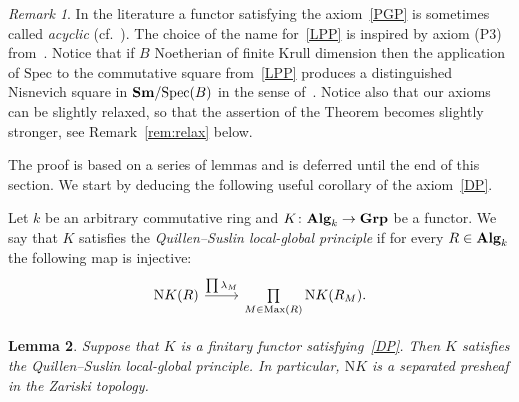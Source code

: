 \documentclass[oneside, 11pt]{amsart}
\numberwithin{equation}{section}
\newtheorem{lemma}{Lemma} \numberwithin{lemma}{section}
\newcommand{\Max}{\mathrm{Max}}
\theoremstyle{definition}
\theoremstyle{definition}
\theoremstyle{remark}
\newtheorem{rem}[lemma]{Remark}
\newcommand{\catname}[1]{{\normalfont\textbf{#1}}} %
\begin{document}
\begin{rem}
 In the literature a functor satisfying the axiom~\ref{PGP} is sometimes called {\it acyclic} (cf.~\cite[Definition~III.4.1.1]{Kbook}).
The choice of the name for~\ref{LPP} is inspired by axiom (P3) from~\cite[Proposition~3.3.4]{AHW18}. Notice that if $B$ Noetherian of finite Krull dimension then the application of $\mathrm{Spec}$ to the commutative square from~\ref{LPP} produces a distinguished Nisnevich square in $\catname{Sm}/\mathrm{Spec}(B)$ in the sense of~\cite[Definition~3.1.3]{MV99}. Notice also that our axioms can be slightly relaxed, so that the assertion of the Theorem becomes slightly stronger, see Remark~\ref{rem:relax} below.
\end{rem}

The proof is based on a series of lemmas and is deferred until the end of this section. We start by deducing the following useful corollary of the axiom~\ref{DP}. 

Let $k$ be an arbitrary commutative ring and $K\colon \catname{Alg}_k \to \catname{Grp}$ be a functor.
We say that $K$ satisfies the {\it Quillen--Suslin local-global principle} if for every $R\in \catname{Alg}_k$ the following map is injective:
\begin{equation} \label{QS-def} \begin{tikzcd} \mathrm NK(R) \ar{r}{\prod \lambda_M} & \prod\limits_{M \in \Max(R)} \mathrm NK(R_M). \end{tikzcd} \end{equation}
\begin{lemma}\label{LGP}
Suppose that $K$ is a finitary functor satisfying~\ref{DP}. Then $K$ satisfies the Quillen--Suslin local-global principle. In particular, $\mathrm NK$ is a separated presheaf in the Zariski topology.
\end{lemma}
\end{document}
